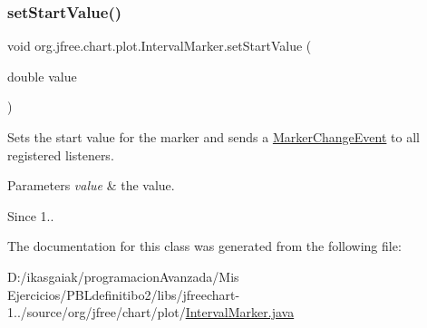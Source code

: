 \subsubsection{\texorpdfstring{set\+Start\+Value()}{setStartValue()}}
{\footnotesize\ttfamily void org.\+jfree.\+chart.\+plot.\+Interval\+Marker.\+set\+Start\+Value (\begin{DoxyParamCaption}\item[{double}]{value }\end{DoxyParamCaption})}

Sets the start value for the marker and sends a \mbox{\hyperlink{}{Marker\+Change\+Event}} to all registered listeners.


\begin{DoxyParams}{Parameters}
{\em value} & the value.\\
\hline
\end{DoxyParams}
\begin{DoxySince}{Since}
1.. 
\end{DoxySince}


The documentation for this class was generated from the following file\+:\begin{DoxyCompactItemize}
\item 
D\+:/ikasgaiak/programacion\+Avanzada/\+Mis Ejercicios/\+P\+B\+Ldefinitibo2/libs/jfreechart-\/1../source/org/jfree/chart/plot/\mbox{\hyperlink{_interval_marker_8java}{Interval\+Marker.\+java}}\end{DoxyCompactItemize}
